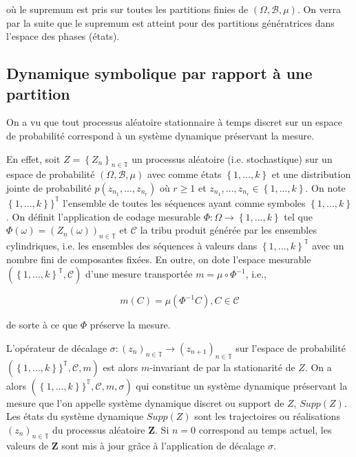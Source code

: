 où le supremum est pris sur toutes les partitions finies de $(\Omega,\mathcal{B},\mu)$.  On verra par la suite que le supremum est atteint pour des partitions génératrices dans l'espace des phases (états).

\subsection*{Dynamique symbolique par rapport à une partition}

\vspace{2ex}
On a vu que tout processus aléatoire stationnaire à temps discret sur un espace de probabilité correspond à un système dynamique préservant la mesure.

\vspace{2ex}
En effet, soit $Z = \left\{Z_n\right\}_{n \in \mathbb{T}}$ un processus aléatoire (i.e. stochastique) sur un espace de probabilité $(\Omega,\mathcal{B},\mu)$ avec comme états $\left\{1,...,k\right\}$ et une distribution jointe de probabilité $p(z_{n_1},...,z_{n_r})$ où $r \geq 1$ et $z_{n_1},...,z_{n_r} \in \left\{1,...,k\right\}$. On note $\left\{1,...,k\right\}\}^\mathbb{T}$ l'ensemble de toutes les séquences ayant comme symboles $\left\{1,...,k\right\}$. On définit l'application de codage mesurable $\Phi : \Omega \longrightarrow \left\{1,...,k\right\}$ tel que $\Phi(\omega) = (Z_n(\omega))_{n \in \mathbb{T}}$ et $\mathcal{C}$ la tribu produit générée par les ensembles cylindriques, i.e. les ensembles des séquences à valeurs dans $\left\{1,...,k\right\}^\mathbb{T}$ avec un nombre fini de composantes fixées. En outre, on dote l'espace mesurable $(\left\{1,...,k\right\}^\mathbb{T}, \mathcal{C})$ d'une mesure transportée $m = \mu \circ \Phi^{-1}$, i.e.,

\begin{equation}
    m(C) = \mu(\Phi^{-1}C), C \in \mathcal{C}
\end{equation}

de sorte à ce que $\Phi$ préserve la mesure. 

L'opérateur de décalage $\sigma : (z_n)_{n \in\mathbb{T}} \longrightarrow (z_{n+1})_{n \in \mathbb{T}}$ sur l'espace de probabilité $(\left\{1,...,k\right\}\}^\mathbb{T}, \mathcal{C},m)$ est alors $m$-invariant de par la stationarité de $Z$.
On a alors $(\left\{1,...,k\right\}\}^\mathbb{T}, \mathcal{C}, m, \sigma)$ qui constitue un système dynamique préservant la mesure que l'on appelle système dynamique discret ou support de $Z$, $Supp(Z)$.
Les états du système dynamique $Supp(Z)$ sont les trajectoires ou réalisations $(z_n)_{n \in \mathbb{T}}$ du processus aléatoire $\textbf{Z}$. Si $n=0$ correspond au temps actuel, les valeurs de $\textbf{Z}$ sont mis à jour grâce à l'application de décalage $\sigma$.

